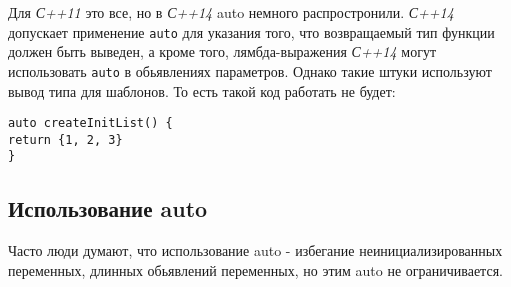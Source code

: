 	Для \textit{С++11} это все, но в \textit{С++14} auto немного распростронили.\textit{ С++14 }допускает применение \texttt{auto} для указания того, что возвращаемый тип функции должен быть выведен, а кроме того, лямбда-выражения \textit{С++14} могут использовать \texttt{auto} в обьявлениях параметров. Однако такие штуки используют вывод типа для шаблонов. То есть такой код работать не будет:
\begin{verbatim}
auto createInitList() {
return {1, 2, 3}
}
\end{verbatim}
	
	\subsection{Использование auto}
	Часто люди думают, что использование auto - избегание неинициализированных переменных, длинных обьявлений переменных, но этим auto не ограничивается.
